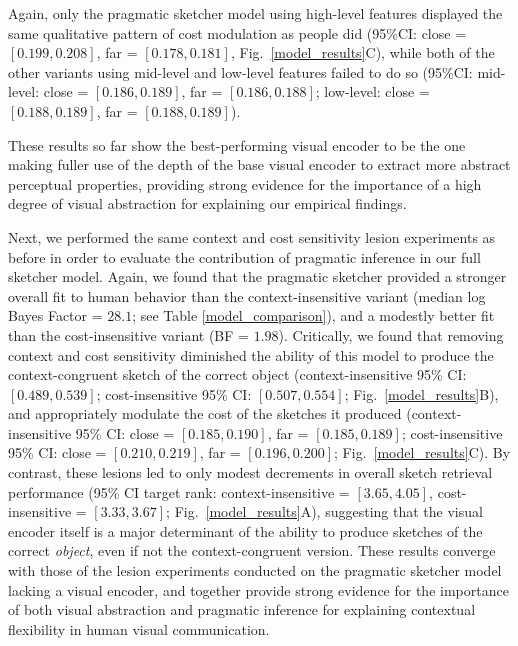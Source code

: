 \documentclass[9pt,twocolumn,twoside]{pnas-new}
\begin{document}
Again, only the pragmatic sketcher model using high-level features displayed the same qualitative pattern of cost modulation as people did (95\%CI: close = $[0.199, 0.208]$, far = $[0.178, 0.181]$, Fig.~\ref{model_results}C), while both of the other variants using mid-level and low-level features failed to do so (95\%CI: mid-level: close = $[0.186, 0.189]$, far = $[0.186, 0.188]$; low-level: close = $[0.188, 0.189]$, far = $[0.188, 0.189]$).  

These results so far show the best-performing visual encoder to be the one making fuller use of the depth of the base visual encoder to extract more abstract perceptual properties, providing strong evidence for the importance of a high degree of visual abstraction for explaining our empirical findings. 

Next, we performed the same context and cost sensitivity lesion experiments as before in order to evaluate the contribution of pragmatic inference in our full sketcher model. 
Again, we found that the pragmatic sketcher provided a stronger overall fit to human behavior than the context-insensitive variant (median log Bayes Factor = $28.1$; see Table \ref{model_comparison}), and a modestly better fit than the cost-insensitive variant (BF = $1.98$). 
Critically, we found that removing context and cost sensitivity diminished the ability of this model to produce the context-congruent sketch of the correct object (context-insensitive 95\% CI: $[0.489, 0.539]$; cost-insensitive 95\% CI: $[0.507, 0.554]$; Fig.~\ref{model_results}B), and appropriately modulate the cost of the sketches it produced (context-insensitive 95\% CI: close = $[0.185, 0.190]$, far = $[0.185, 0.189]$; cost-insensitive 95\% CI: close = $[0.210, 0.219]$, far = $[0.196, 0.200]$; Fig.~\ref{model_results}C). 
By contrast, these lesions led to only modest decrements in overall sketch retrieval performance (95\% CI target rank: context-insensitive = $[3.65, 4.05]$, cost-insensitive = $[3.33, 3.67]$;  Fig.~\ref{model_results}A), suggesting that the visual encoder itself is a major determinant of the ability to produce sketches of the correct \textit{object}, even if not the context-congruent version.
These results converge with those of the lesion experiments conducted on the pragmatic sketcher model lacking a visual encoder, and together provide strong evidence for the importance of both visual abstraction and pragmatic inference for explaining contextual flexibility in human visual communication. 
\end{document}
